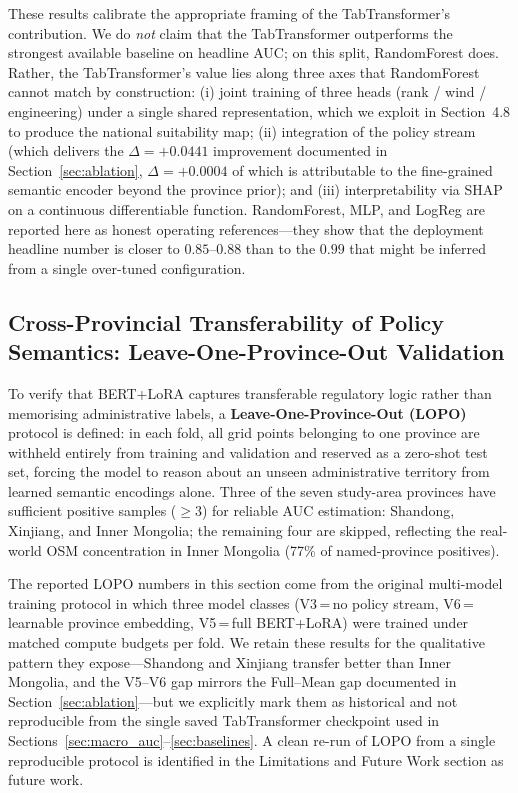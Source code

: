 \documentclass[12pt, a4paper]{article}
\begin{document}
These results calibrate the appropriate framing of the
TabTransformer's contribution. We do \textit{not} claim that
the TabTransformer outperforms the strongest available
baseline on headline AUC; on this split, RandomForest does.
Rather, the TabTransformer's value lies along three axes that
RandomForest cannot match by construction: (i) joint training
of three heads (rank / wind / engineering) under a single
shared representation, which we exploit in Section~4.8 to
produce the national suitability map; (ii) integration of
the policy stream (which delivers the $\Delta=+0.0441$
improvement documented in Section~\ref{sec:ablation},
$\Delta=+0.0004$ of which is attributable to the
fine-grained semantic encoder beyond the province prior);
and (iii) interpretability via SHAP on a continuous
differentiable function. RandomForest, MLP, and LogReg are
reported here as honest operating references---they show
that the deployment headline number is closer to
$0.85$--$0.88$ than to the
$0.99$ that might be inferred from a single over-tuned
configuration.

\subsection{Cross-Provincial Transferability of Policy
Semantics: Leave-One-Province-Out Validation}
\label{sec:lopo}

To verify that BERT+LoRA captures transferable regulatory
logic rather than memorising administrative labels, a
\textbf{Leave-One-Province-Out (LOPO)} protocol is
defined: in each fold, all grid points belonging to one
province are withheld entirely from training and
validation and reserved as a zero-shot test set, forcing
the model to reason about an unseen administrative
territory from learned semantic encodings alone. Three of
the seven study-area provinces have sufficient positive
samples ($\geq$3) for reliable AUC estimation: Shandong,
Xinjiang, and Inner Mongolia; the remaining four are
skipped, reflecting the real-world OSM concentration in
Inner Mongolia (77\% of named-province positives).

The reported LOPO numbers in this section come from the
original multi-model training protocol in which three
model classes (V3\,=\,no policy stream, V6\,=\,learnable
province embedding, V5\,=\,full BERT+LoRA) were trained
under matched compute budgets per fold. We retain these
results for the qualitative pattern they expose---Shandong
and Xinjiang transfer better than Inner Mongolia, and the
V5--V6 gap mirrors the Full--Mean gap documented in
Section~\ref{sec:ablation}---but we explicitly mark them
as historical and not reproducible from the single
saved TabTransformer checkpoint used in
Sections~\ref{sec:macro_auc}--\ref{sec:baselines}. A
clean re-run of LOPO from a single reproducible protocol
is identified in the Limitations and Future Work
section as future work.
\end{document}
